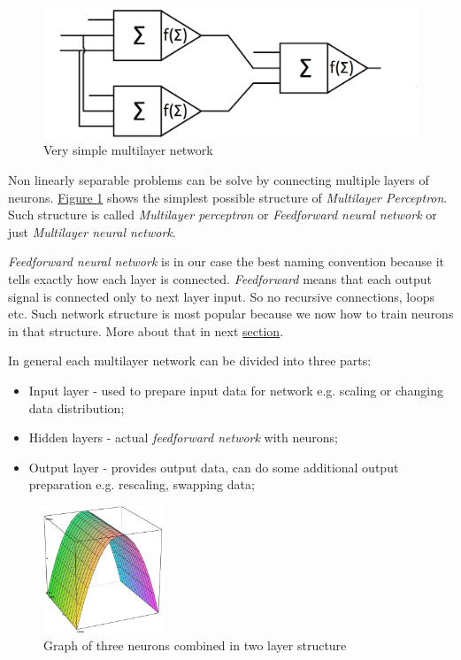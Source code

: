 \begin{figure}[!h]
    \centering
    \includegraphics[scale=0.2]{Media/MLN.png}
    \caption[Multilayer network]{Very simple multilayer network}
    \label{fig:MLN}
\end{figure}

Non linearly separable problems can be solve by connecting multiple layers of neurons. \hyperref[fig:MLN]{Figure \ref{fig:MLN}} shows the simplest possible structure of \textit{Multilayer Perceptron}. Such structure is called \textit{Multilayer perceptron} or \textit{Feedforward neural network} or just \textit{Multilayer neural network}.

\textit{Feedforward neural network} is in our case the best naming convention because it tells exactly how each layer is connected. \textit{Feedforward} means that each output signal is connected only to next layer input. So no recursive connections, loops etc. Such network structure is most popular because we now how to train neurons in that structure. More about that in next \hyperref[sec:Training]{section}.

In general each multilayer network can be divided into three parts:
\begin{itemize}
    \item Input layer - used to prepare input data for network e.g. scaling or changing data distribution;
    \item Hidden layers - actual \textit{feedforward network} with neurons; 
    \item Output layer - provides output data, can do some additional output preparation e.g. rescaling, swapping data;
\end{itemize}

\begin{figure}
    \includegraphics[width=0.32\textwidth]{Media/Bridge.png}
    \caption{Graph of three neurons combined in two layer structure}
    \label{fig:BridgeGraph}
\end{figure}

